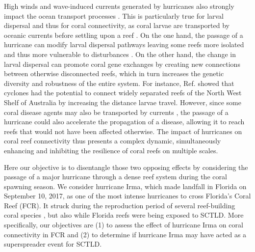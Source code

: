 \documentclass[fleqn,10pt]{wlscirep}
\newcommand{\modif}[1]{{#1}}
\begin{document}
High winds and wave-induced currents generated by hurricanes also strongly impact the ocean transport processes \citep{DobbyIrma,Oey2007May,liu2020impacts}. This is particularly true for larval dispersal and thus for coral connectivity, as coral larvae are transported by oceanic currents before settling upon a reef \citep{Shulman1995Oct}. On the one hand, the passage of a hurricane can modify larval dispersal pathways leaving some reefs more isolated and thus more vulnerable to disturbances \citep{grimaldi2022hydrodynamic}. On the other hand, the change in larval dispersal can promote coral gene exchanges by creating new connections between otherwise disconnected reefs, which in turn increases the genetic diversity and robustness of the entire system. \modif{For instance, Ref. \cite{radford2014cyclones} showed that cyclones had the potential to connect widely separated reefs of the North West Shelf of Australia by increasing the distance larvae travel}. However, since \modif{some coral disease agents may also be} transported by currents \citep{DobbySCTLD}, the passage of a hurricane could also accelerate the propagation of a disease, allowing it to reach reefs that would not have been affected otherwise. The impact of hurricanes on coral reef connectivity thus presents a complex dynamic, simultaneously enhancing and inhibiting the resilience of coral reefs on multiple scales.

Here our objective is to disentangle those two opposing effects by considering the passage of a major hurricane through a dense reef system during the coral spawning season. We consider hurricane Irma, which made landfall in Florida on September 10, 2017, as one of the most intense hurricanes to cross Florida's Coral Reef (FCR). It struck during the reproduction period of several reef-building coral species \citep{quicklook2020}, but also while Florida reefs were being exposed to SCTLD. More specifically, our objectives are (1) to assess the effect of hurricane Irma on coral connectivity in FCR and (2) to determine if hurricane Irma \modif{may have} acted as a superspreader event for SCTLD.
\end{document}
